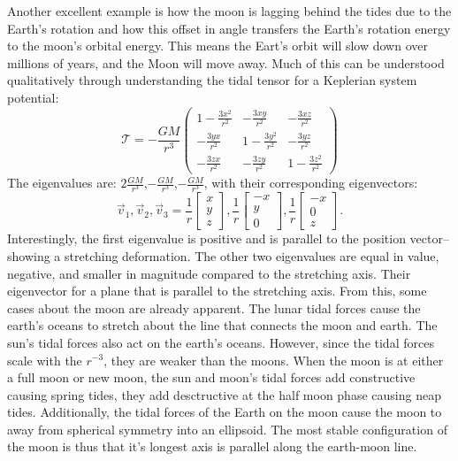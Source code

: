             Another excellent example is how the moon is lagging behind the tides due to the Earth's rotation and how this offset in angle transfers the Earth's rotation energy to the moon's orbital energy. This means the Eart's orbit will slow down over millions of years, and the Moon will move away. Much of this can be understood qualitatively through understanding the tidal tensor for a Keplerian system potential: 
            \begin{equation}
                \mathcal{T}= -\frac{GM}{r^3}\left(\begin{matrix}
                    1-\frac{3x^2}{r^2} & -\frac{3xy}{r^2} & -\frac{3xz}{r^2} \\
                    -\frac{3yx}{r^2} & 1-\frac{3y^2}{r^2} & -\frac{3yz}{r^2} \\
                    -\frac{3zx}{r^2} & -\frac{3zy}{r^2} & 1-\frac{3z^2}{r^2}
                \end{matrix}\right)
            \end{equation}
            The eigenvalues are: $2\frac{GM}{r^3}$,$-\frac{GM}{r^3}$,$-\frac{GM}{r^3}$, with their corresponding eigenvectors: 
            \begin{equation}
                \vec{v}_1,\vec{v}_2,\vec{v}_3=\dfrac{1}{r}\begin{bmatrix} x \\ y \\ z \end{bmatrix}, \dfrac{1}{r}\begin{bmatrix} -x \\ y \\ 0 \end{bmatrix}, \dfrac{1}{r}\begin{bmatrix} -x \\ 0 \\ z \end{bmatrix}.
            \end{equation}
            Interestingly, the first eigenvalue is positive and is parallel to the position vector--showing a stretching deformation. The other two eigenvalues are equal in value, negative, and smaller in magnitude compared to the stretching axis. Their eigenvector for a plane that is parallel to the stretching axis. From this, some cases about the moon are already apparent. The lunar tidal forces cause the earth's oceans to stretch about the line that connects the moon and earth. The sun's tidal forces also act on the earth's oceans. However, since the tidal forces scale with the $r^{-3}$, they are weaker than the moons. When the moon is at either a full moon or new moon, the sun and moon's tidal forces add constructive causing spring tides, they add desctructive at the half moon phase causing neap tides. Additionally, the tidal forces of the Earth on the moon cause the moon to away from spherical symmetry into an ellipsoid. The most stable configuration of the moon is thus that it's longest axis is parallel along the earth-moon line. 

